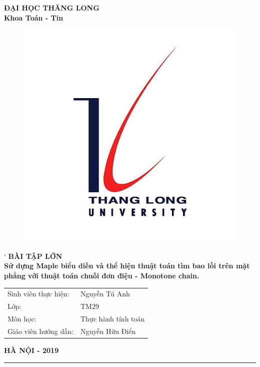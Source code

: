 %
\begin{titlepage}
    \begin{center}
        {\bfseries ĐẠI HỌC THĂNG LONG\\Khoa Toán - Tin}
    \end{center}
    \vspace*{1cm}
    \begin{figure}[!ht]
        \centering
        \includegraphics[scale = 0.4]{Image/LogoTLU}
    \end{figure}
    \vspace*{1cm}
    \begin{center}
`       {\Large \bfseries BÀI TẬP LỚN\\}
        \vspace*{1cm}
        {\huge \bfseries  Sử dựng Maple biểu diễn và thể hiện thuật toán tìm bao lồi  trên mặt phẳng với thuật toán chuỗi đơn điệu - Monotone chain.}
    \end{center}
    \vspace*{1cm}
    \begin{flushright}
        \parbox[l]{8cm}{
            \bfseries
            \begin{tabular}{ l  l }
                Sinh viên thực hiện:& Nguyễn Tú Anh \\
                Lớp:& TM29  \\
                Môn học:& Thực hành tính toán\\
                Giáo viên hướng dẫn:& Nguyễn Hữu Điển \\
            \end{tabular}
        }
    \end{flushright}
    \vfill
    \centerline{\bf HÀ NỘI - 2019}
\end{titlepage}
\vfill
\hrule
\thispagestyle{empty}